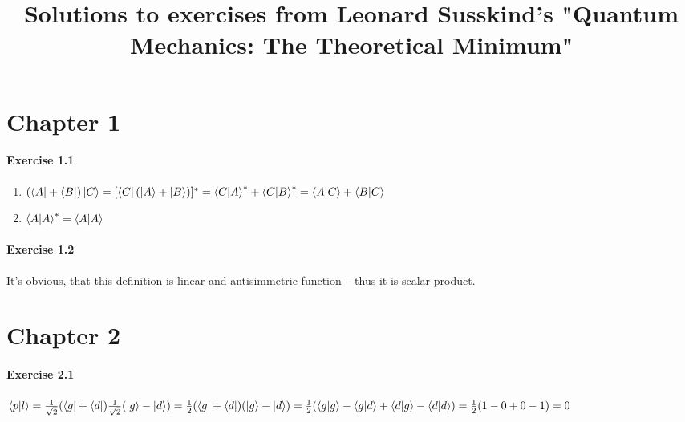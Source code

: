 \documentclass[a4paper]{article}
\title{Solutions to exercises from Leonard Susskind's "Quantum Mechanics: The Theoretical Minimum"}
\date{}
\begin{document}
\maketitle
\tableofcontents

\section{Chapter 1}

\paragraph{Exercise 1.1}

\begin{enumerate}
    \item
        \begin{math}
            (\bra{A} + \bra{B}) \ket{C} = [\bra{C} (\ket{A} + \ket{B})]^{*} =
            \bra{C}\ket{A}^{*} + \bra{C}\ket{B}^{*} =
            \bra{A}\ket{C} + \bra{B}\ket{C}
        \end{math}
    \item
        \begin{math}
            \bra{A}\ket{A}^{*} = \bra{A}\ket{A}
        \end{math}
\end{enumerate}

\paragraph{Exercise 1.2}

It's obvious, that this definition is linear and antisimmetric function -- thus it is scalar product.

\section{Chapter 2}

\paragraph{Exercise 2.1}

\begin{math}
    \bra{p}\ket{l} = \frac{1}{\sqrt{2}} (\bra{g} + \bra{d}) \frac{1}{\sqrt{2}} (\ket{g} - \ket{d}) =
    \frac{1}{2} (\bra{g} + \bra{d}) (\ket{g} - \ket{d}) =
    \frac{1}{2} (\bra{g}\ket{g} - \bra{g}\ket{d} + \bra{d}\ket{g} - \bra{d}\ket{d}) =
    \frac{1}{2} (1 - 0 + 0 - 1) = 0
\end{math}
\end{document}

